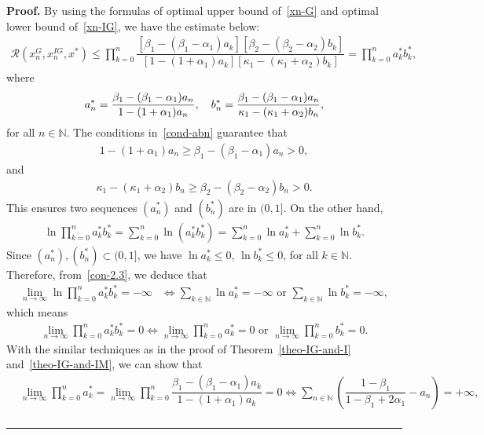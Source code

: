 \documentclass[a4paper, 11pt]{article}
\newenvironment{proof}[1][Proof]{\textbf{#1.} }{\hfill\rule{0.5em}{0.5em}}
\begin{document}
\begin{proof}
By using the formulas of optimal upper bound of~\eqref{xn-G} and optimal lower bound of~\eqref{xn-IG}, we have the estimate below: \begin{align}\label{est-2.3}
\mathcal{R}(x_n^G,x_n^{IG},x^*)	\le \prod_{k=0}^n \dfrac{\left[\beta_1-(\beta_1-\alpha_1)a_k\right]\left[\beta_2-(\beta_2-\alpha_2)b_k\right]}{\left[1-(1+\alpha_1)a_k\right]\left[\kappa_1-(\kappa_1+\alpha_2)b_k\right]}=\prod_{k=0}^n a^*_k b^*_k,
\end{align}
where 
\begin{align}\notag %
	a^*_n=\frac{\beta_1-(\beta_1-\alpha_1)a_n}{1-(1+\alpha_1)a_n}, \quad  b^*_n=\dfrac{\beta_1-(\beta_1-\alpha_1)a_n}{\kappa_1-(\kappa_1+\alpha_2)b_n},
\end{align}
for all $n \in \mathbb{N}$. The conditions in~\eqref{cond-abn} guarantee that \begin{align*}
	1-(1+\alpha_1)a_n\geq \beta_1-(\beta_1-\alpha_1)a_n>0,
\end{align*} 
and
\begin{align*}
\kappa_1-(\kappa_1+\alpha_2)b_n\geq \beta_2-(\beta_2-\alpha_2)b_n>0.
\end{align*} 
This ensures two sequences $(a^*_n)$ and $(b^*_n)$ are in $(0,1]$.
On the other hand, \begin{align}\label{con-2.3}
	\ln \prod_{k=0}^n  a^*_kb^*_k=\displaystyle\sum_{k=0}^{n}\ln (a^*_k b^*_k)=\displaystyle\sum_{k=0}^{n}\ln a^*_k+\displaystyle\sum_{k=0}^{n}\ln b^*_k.
\end{align}
Since $(a^*_n),(b^*_n)\subset (0,1]$, we have $\ln a^*_k\leq 0$, $\ln b^*_k\leq 0$, for all $k \in \mathbb{N}$. Therefore, from~\eqref{con-2.3}, we deduce that \begin{align*}
	\lim\limits_{n\to \infty}\ln \prod_{k=0}^{n} a^*_kb^*_k=-\infty &\iff \sum_{k \in \mathbb{N}}\ln a^*_k=-\infty \text{ or } \sum_{k \in \mathbb{N}}\ln b^*_k=-\infty,
\end{align*}
which means \begin{align}\label{cond-2.3-1}
	\lim\limits_{n\to \infty}\prod_{k=0}^n a^*_kb^*_k=0\iff \lim\limits_{n\to \infty}\prod_{k=0}^n a^*_k=0 \text{ or } \lim\limits_{n\to \infty}\prod_{k=0}^n b^*_k=0.
\end{align}
With the similar techniques as in the proof of Theorem~\ref{theo-IG-and-I} and~\ref{theo-IG-and-IM}, we can show that \begin{align}
	&\lim\limits_{n\to \infty}\prod_{k=0}^n a^*_k=\lim\limits_{n\to \infty}\prod_{k=0}^n \dfrac{\beta_1-(\beta_1-\alpha_1)a_k}{1-(1+\alpha_1)a_k}=0\Leftrightarrow \displaystyle\sum_{n \in \mathbb{N}}\left(\dfrac{1-\beta_1}{1-\beta_1+2\alpha_1}-a_n\right)=+\infty,\label{conv-2.3.1}\\

\end{align}
\end{proof}
\end{document}

